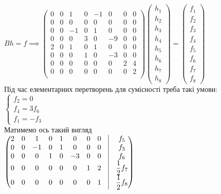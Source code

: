 \documentclass[a4paper, 10pt]{article}
\theoremstyle{theoremdd}
\begin{document}
$Bh = f \implies \begin{pmatrix}
0 & 0 & 1 & 0 & -1 & 0 & 0 & 0 \\
0 & 0 & 0 & 0 & 0 & 0 & 0 & 0 \\
0 & 0 & -1 & 0 & 1 & 0 & 0 & 0 \\
0 & 0 & 0 & 3 & 0 & -9 & 0 & 0 \\
2 & 0 & 1 & 0 & 1 & 0 & 0 & 0 \\
0 & 0 & 0 & 1 & 0 & -3 & 0 & 0 \\
0 & 0 & 0 & 0 & 0 & 0 & 2 & 4 \\
0 & 0 & 0 & 0 & 0 & 0 & 0 & 2 \\
\end{pmatrix} \begin{pmatrix}
h_1 \\ h_2 \\ h_3 \\ h_4 \\ h_5 \\ h_6 \\ h_7 \\ h_8
\end{pmatrix} = \begin{pmatrix}
f_1 \\ f_2 \\ f_3 \\ f_4 \\ f_5 \\ f_6 \\ f_7 \\ f_8
\end{pmatrix}$\\
Під час елементарних перетворень для сумісності треба такі умови:\\
$\begin{cases}
f_2 = 0 \\
f_4 = 3f_6 \\
f_1 = -f_3
\end{cases}$\\
Матимемо ось такий вигляд\\
$\begin{pmatrix}
2 & 0 & 1 & 0 & 1 & 0 & 0 & 0 & \vline & f_5 \\
0 & 0 & -1 & 0 & 1 & 0 & 0 & 0 & \vline & f_3 \\
0 & 0 & 0 & 1 & 0 & -3 & 0 & 0 & \vline & f_6 \\
0 & 0 & 0 & 0 & 0 & 0 & 1 & 2 & \vline & \dfrac{1}{2}f_7 \\
0 & 0 & 0 & 0 & 0 & 0 & 0 & 1 & \vline & \dfrac{1}{2}f_8 \\
\end{pmatrix}$\\
\end{document}
